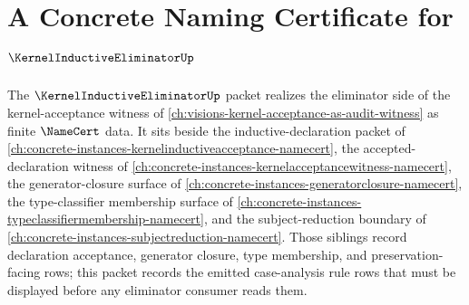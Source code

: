 \chapter{A Concrete Naming Certificate for $\KernelInductiveEliminatorUp$}
\label{ch:concrete-instances-kernelinductiveeliminator-namecert}

The $\KernelInductiveEliminatorUp$ packet realizes the eliminator side of the kernel-acceptance witness of \autoref{ch:visions-kernel-acceptance-as-audit-witness} as finite $\NameCert$ data. It sits beside the inductive-declaration packet of \autoref{ch:concrete-instances-kernelinductiveacceptance-namecert}, the accepted-declaration witness of \autoref{ch:concrete-instances-kernelacceptancewitness-namecert}, the generator-closure surface of \autoref{ch:concrete-instances-generatorclosure-namecert}, the type-classifier membership surface of \autoref{ch:concrete-instances-typeclassifiermembership-namecert}, and the subject-reduction boundary of \autoref{ch:concrete-instances-subjectreduction-namecert}. Those siblings record declaration acceptance, generator closure, type membership, and preservation-facing rows; this packet records the emitted case-analysis rule rows that must be displayed before any eliminator consumer reads them.

